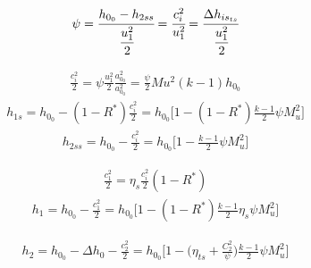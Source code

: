 \begin{align*}
\psi	= \cfrac{h_{0_0} - h_{2ss}}{\cfrac{u_1^2}{2}} = \cfrac{c_i^2}{u_1^2} = \cfrac{\Delta h_{is_{ts}}}{\cfrac{u_1^2}{2}}
\end{align*}

\begin{align*}
\frac{c_i^2}{2} = \psi \frac{u_1^2}{2} \frac{a_{0_0}^2}{a_{0_0}^2} = \frac{\psi}{2} Mu^2 (k-1) h_{0_0}
\end{align*}
\begin{align*}
h_{1s} = h_{0_0} - \left(1- R^* \right) \frac{c_i^2}{2} = h_{0_0} \bigg[ 1- \left( 1- R^* \right) \frac{k-1}{2} \psi M_u^2 \bigg]
\end{align*}
\begin{align*}
h_{2ss} = h_{0_0} - \frac{c_i^2}{2} = h_{0_0} \bigg[ 1 - \frac{k-1}{2} \psi M_u^2 \bigg]
\end{align*}

\begin{align*}
\frac{c_1^2}{2} = \eta_s \frac{c_i^2}{2} \left( 1- R^* \right)
\end{align*}
\begin{align*}
h_1 = h_{0_0} - \frac{c_1^2}{2} = h_{0_0} \bigg[ 1- \left( 1- R^* \right) \frac{k-1}{2} \eta_s \psi M_u^2 \bigg]
\end{align*}

\begin{align*}
h_2 = h_{0_0} - \Delta h_0 - \frac{c_2^2}{2} = h_{0_0} \bigg[ 1- \bigg( \eta_{ts} + \frac{C_2^2}{\psi} \bigg) \frac{k-1}{2} \psi M_u^2 \bigg]
\end{align*}
